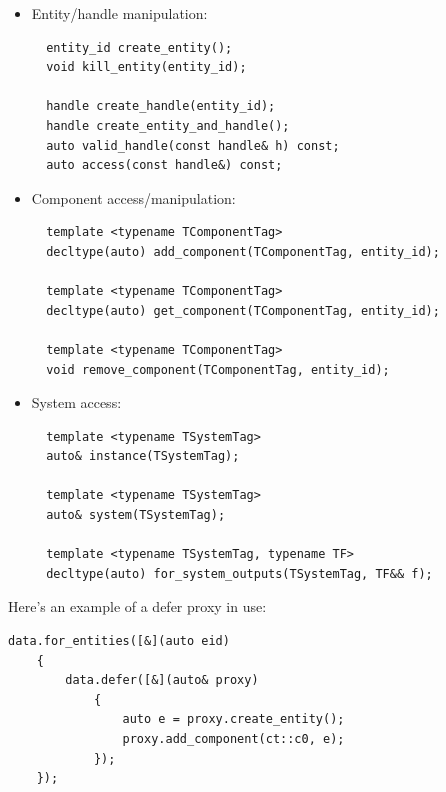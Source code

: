 \documentclass[twoside, 12pt, a4paper, openany]{book}
\begin{document}
\begin{itemize}
\item
  Entity/handle manipulation:

  \begin{verbatim}
  entity_id create_entity();
  void kill_entity(entity_id);

  handle create_handle(entity_id);
  handle create_entity_and_handle();
  auto valid_handle(const handle& h) const;
  auto access(const handle&) const;
  \end{verbatim}
\item
  Component access/manipulation:

  \begin{verbatim}
  template <typename TComponentTag>
  decltype(auto) add_component(TComponentTag, entity_id);

  template <typename TComponentTag>
  decltype(auto) get_component(TComponentTag, entity_id);

  template <typename TComponentTag>
  void remove_component(TComponentTag, entity_id);
  \end{verbatim}
\item
  System access:

  \begin{verbatim}
  template <typename TSystemTag>
  auto& instance(TSystemTag);

  template <typename TSystemTag>
  auto& system(TSystemTag);

  template <typename TSystemTag, typename TF>
  decltype(auto) for_system_outputs(TSystemTag, TF&& f);
  \end{verbatim}
\end{itemize}

Here's an example of a defer proxy in use:

\begin{verbatim}
data.for_entities([&](auto eid)
    {
        data.defer([&](auto& proxy)
            {
                auto e = proxy.create_entity();
                proxy.add_component(ct::c0, e);
            });
    });
\end{verbatim}
\end{document}
